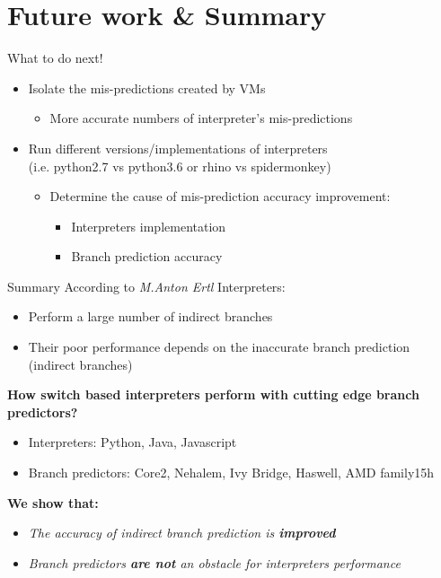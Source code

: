 \documentclass[10pt]{beamer}
\begin{document}
\section{Future work \& Summary}
\begin{frame}{What to do next!}
	\begin{itemize}
		\item {Isolate the mis-predictions created by VMs}
		\begin{itemize}
			\item{More accurate numbers of interpreter's mis-predictions}
		\end{itemize}
		\item {Run different versions/implementations of interpreters\\\small (i.e. python2.7 vs python3.6 or rhino vs spidermonkey)}
			\begin{itemize}
				\item{Determine the cause of mis-prediction accuracy improvement:}
				\begin{itemize}
						\item {Interpreters implementation}
						\item {Branch prediction accuracy}
				\end{itemize}
			\end{itemize}
	\end{itemize}
\end{frame}
\begin{frame}{Summary}
	According to \textit{M.Anton Ertl\footnotemark[1]} Interpreters:
		\begin{itemize}
			\item{Perform a large number of indirect branches}
			\item{Their poor performance depends on the inaccurate branch prediction (indirect branches)}
		\end{itemize}
		\textbf{How switch based interpreters perform with cutting edge branch predictors?}
		\begin{itemize}
			\item{Interpreters: Python, Java, Javascript}
			\item{Branch predictors: Core2, Nehalem, Ivy Bridge, Haswell, AMD family15h}
		\end{itemize}
		\textbf{We show that:}
		\begin{itemize}
			\item{\textit{The accuracy of indirect branch prediction is \textbf{improved}}}
			\item{\textit{Branch predictors \textbf{are not} an obstacle for interpreters performance}}
		\end{itemize}
		
\end{frame}
\end{document}

